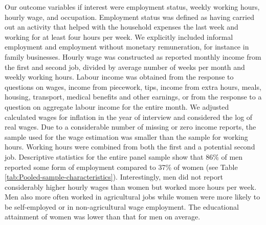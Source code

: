 \documentclass[12pt,english]{article}
\begin{document}
Our outcome variables if interest were employment status, weekly working hours, hourly wage, and occupation. Employment status was defined as having carried out an activity that helped with the household expenses the last week and working for at least four hours per week. We explicitly included informal employment and employment without monetary remuneration, for instance in family businesses.  Hourly wage was constructed as reported monthly income from the first and second job, divided by average number of weeks per month and weekly working hours.  Labour income was obtained from the response to questions on wages, income from piecework, tips, income from extra hours, meals, housing, transport, medical benefits and other earnings, or from the response to a question on aggregate labour income for the entire month. We adjusted calculated wages for inflation in the year of interview and considered the log of real wages. Due to a considerable number of missing or zero income reports, the sample used for the wage estimation was smaller than the sample for working hours. Working hours were combined from both the first and a potential second job. Descriptive statistics for the entire panel sample show that 86\% of men reported some form of employment compared to 37\% of women (see Table \ref{tab:Pooled-sample-characteristics}). Interestingly, men did not report considerably higher hourly wages than women but worked more hours per week. Men also more often worked in agricultural jobs while women were more likely to be self-employed or in non-agricultural wage employment. The educational attainment of women was lower than that for men on average.
\end{document}

